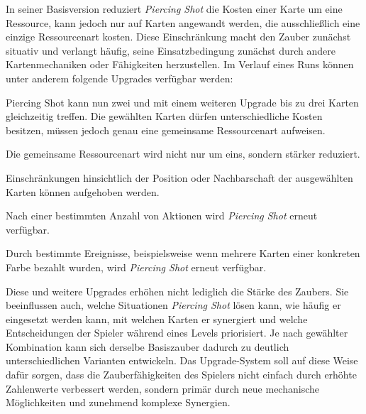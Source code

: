 In seiner Basisversion reduziert \emph{Piercing Shot} die Kosten einer Karte um eine Ressource, kann jedoch nur auf Karten angewandt werden, die ausschließlich eine einzige Ressourcenart kosten.
Diese Einschränkung macht den Zauber zunächst situativ und verlangt häufig, seine Einsatzbedingung zunächst durch andere Kartenmechaniken oder Fähigkeiten herzustellen.
Im Verlauf eines Runs können unter anderem folgende Upgrades verfügbar werden:
\begin{description}[itemsep=0pt]
    \item[Mehr Ziele:] Piercing Shot kann nun zwei und mit einem weiteren Upgrade bis zu drei Karten gleichzeitig treffen. Die gewählten Karten dürfen unterschiedliche Kosten besitzen, müssen jedoch genau eine gemeinsame Ressourcenart aufweisen.
    \item[Stärkerer Effekt:] Die gemeinsame Ressourcenart wird nicht nur um eins, sondern stärker reduziert.
    \item[Größere räumliche Freiheit:]
     Einschränkungen hinsichtlich der Position oder Nachbarschaft der ausgewählten Karten können aufgehoben werden.
    \item[Cooldown:] Nach einer bestimmten Anzahl von Aktionen wird \emph{Piercing Shot} erneut verfügbar.
    \item[Wiederaufladen:] Durch bestimmte Ereignisse, beispielsweise wenn mehrere Karten einer konkreten Farbe bezahlt wurden, wird \emph{Piercing Shot} erneut verfügbar.
\end{description}

Diese und weitere Upgrades erhöhen nicht lediglich die Stärke des Zaubers.
Sie beeinflussen auch, welche Situationen \emph{Piercing Shot} lösen kann, wie häufig er eingesetzt werden kann, mit welchen Karten er synergiert und welche Entscheidungen der Spieler während eines Levels priorisiert.
Je nach gewählter Kombination kann sich derselbe Basiszauber dadurch zu deutlich unterschiedlichen Varianten entwickeln.
Das Upgrade-System soll auf diese Weise dafür sorgen, dass die Zauberfähigkeiten des Spielers nicht einfach durch erhöhte Zahlenwerte verbessert werden, sondern primär durch neue mechanische Möglichkeiten und zunehmend komplexe Synergien.



